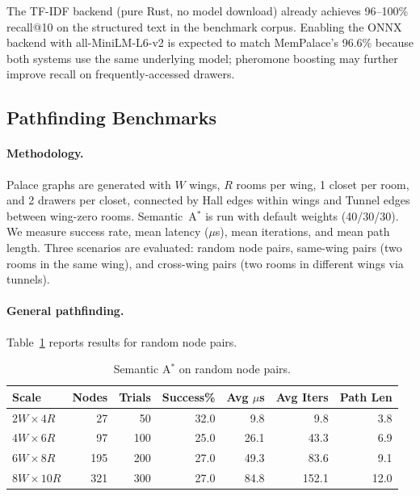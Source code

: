 \documentclass[11pt,a4paper]{article}
\begin{document}
The TF-IDF backend (pure Rust, no model download) already achieves 96--100\%
recall@10 on the structured text in the benchmark corpus.  Enabling the ONNX
backend with all-MiniLM-L6-v2 is expected to match MemPalace's 96.6\% because
both systems use the same underlying model; pheromone boosting may further
improve recall on frequently-accessed drawers.

\subsection{Pathfinding Benchmarks}
\label{sec:pathfind_bench}

\paragraph{Methodology.}
Palace graphs are generated with $W$ wings, $R$ rooms per wing, 1 closet per
room, and 2 drawers per closet, connected by Hall edges within wings and Tunnel
edges between wing-zero rooms.  Semantic~A$^*$ is run with default weights
(40/30/30).  We measure success rate, mean latency ($\mu$s), mean iterations,
and mean path length.  Three scenarios are evaluated: random node pairs,
same-wing pairs (two rooms in the same wing), and cross-wing pairs (two rooms
in different wings via tunnels).

\paragraph{General pathfinding.}
Table~\ref{tab:astar_general} reports results for random node pairs.

\begin{table}[ht]
\centering
\caption{Semantic A$^*$ on random node pairs.}
\label{tab:astar_general}
\begin{tabular}{lrrrrrr}
\toprule
\textbf{Scale} & \textbf{Nodes} & \textbf{Trials} & \textbf{Success\%} & \textbf{Avg $\mu$s} & \textbf{Avg Iters} & \textbf{Path Len} \\
\midrule
$2W \times 4R$ &  27 &  50 & 32.0 &  9.8 &  9.8 & 3.8 \\
$4W \times 6R$ &  97 & 100 & 25.0 & 26.1 & 43.3 & 6.9 \\
$6W \times 8R$ & 195 & 200 & 27.0 & 49.3 & 83.6 & 9.1 \\
$8W \times 10R$ & 321 & 300 & 27.0 & 84.8 & 152.1 & 12.0 \\
\bottomrule
\end{tabular}
\end{table}
\end{document}
